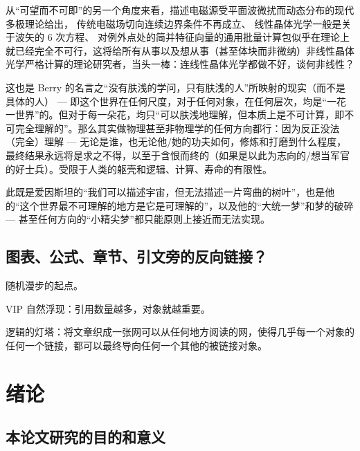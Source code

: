 从“可望而不可即”的另一个角度来看，描述电磁源受平面波微扰而动态分布的现代多极理论给出，{\one} 传统电磁场切向连续边界条件不再成立、{\two} 线性晶体光学一般是关于波矢的 6 次方程、{\three} 对例外点处的简并特征向量的通用批量计算包似乎在理论上就已经完全不可行，这将给所有从事以及想从事（甚至体块而非微纳）非线性晶体光学严格计算的理论研究者，当头一棒：连线性晶体光学都做不好，谈何非线性？

这也是 Berry 的名言之“没有肤浅的学问，只有肤浅的人”所映射的现实（而不是具体的人） --- 即这个世界在任何尺度，对于任何对象，在任何层次，均是“一花一世界”的。但对于每一朵花，均只“可以肤浅地理解，但本质上是不可计算，即不可完全理解的”。那么其实做物理甚至非物理学的任何方向都行：因为反正没法（完全）理解 --- 无论是谁，也无论他/她的功夫如何，修炼和打磨到什么程度，最终结果永远将是求之不得，以至于含恨而终的（如果是以此为志向的/想当军官的好士兵）。受限于人类的躯壳和逻辑、计算、寿命的有限性。

此既是爱因斯坦的“我们可以描述宇宙，但无法描述一片弯曲的树叶”，也是他的“这个世界最不可理解的地方是它是可理解的”，以及他的“大统一梦”和梦的破碎 --- 甚至任何方向的“小精尖梦”都只能原则上接近而无法实现。

\section{图表、公式、章节、引文旁的反向链接？}

{\one} 随机漫步的起点。

{\two} VIP 自然浮现：引用数量越多，对象就越重要。

{\three} 逻辑的灯塔：将文章织成一张网可以从任何地方阅读的网，使得几乎每一个对象的任何一个链接，都可以最终导向任何一个其他的被链接对象。



\label{第一章开始}
\chapter{绪论}

\section{本论文研究的目的和意义}

